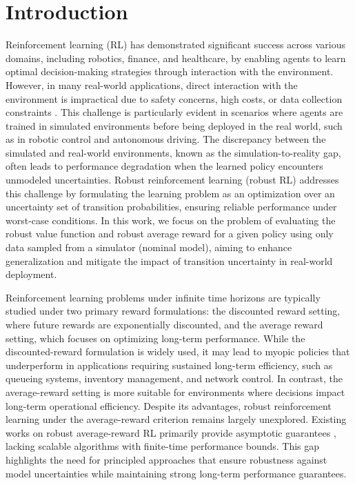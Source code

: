\section{Introduction}

Reinforcement learning (RL) has demonstrated significant success across various domains, including robotics, finance, and healthcare, by enabling agents to learn optimal decision-making strategies through interaction with the environment. However, in many real-world applications, direct interaction with the environment is impractical due to safety concerns, high costs, or data collection constraints \citep{sunderhauf2018limits, hofer2021sim2real}. This challenge is particularly evident in scenarios where agents are trained in simulated environments before being deployed in the real world, such as in robotic control and autonomous driving. The discrepancy between the simulated and real-world environments, known as the simulation-to-reality gap, often leads to performance degradation when the learned policy encounters unmodeled uncertainties. Robust reinforcement learning (robust RL) addresses this challenge by formulating the learning problem as an optimization over an uncertainty set of transition probabilities, ensuring reliable performance under worst-case conditions. In this work, we focus on the problem of evaluating the robust value function and robust average reward for a given policy using only data sampled from a simulator (nominal model), aiming to enhance generalization and mitigate the impact of transition uncertainty in real-world deployment.

Reinforcement learning problems under infinite time horizons are typically studied under two primary reward formulations: the discounted reward setting, where future rewards are exponentially discounted, and the average reward setting, which focuses on optimizing long-term performance. While the discounted-reward formulation is widely used, it may lead to myopic policies that underperform in applications requiring sustained long-term efficiency, such as queueing systems, inventory management, and network control. In contrast, the average-reward setting is more suitable for environments where decisions impact long-term operational efficiency. Despite its advantages, robust reinforcement learning under the average-reward criterion remains largely unexplored. Existing works on robust average-reward RL primarily provide asymptotic guarantees \citep{wang2023robust,wang2023model, wang2024robust}, lacking scalable algorithms with finite-time performance bounds. This gap highlights the need for principled approaches that ensure robustness against model uncertainties while maintaining strong long-term performance guarantees.

